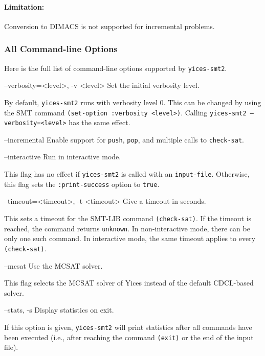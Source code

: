 \documentclass[11pt,twoside,fleqn,openright,titlepage]{cslreport}
\newenvironment{options}{
\begin{list}{}{
\setlength{\labelsep}{1.8ex}
\setlength{\labelwidth}{0pt}
\setlength{\itemindent}{-0.5\leftmargin}
\settowidth{\leftmargin}{\texttt{--}}
\renewcommand{\makelabel}{\optionlabel}}}
{\end{list}}
\newcommand*\optionlabel[1]{\hspace\labelsep\texttt{#1}}
\begin{document}
\paragraph{Limitation:} Conversion to DIMACS is not supported for incremental problems.



\subsubsection*{All Command-line Options}

Here is the full list of command-line options supported by
\texttt{yices-smt2}.
\begin{options}
\item[--verbosity=<level>, -v <level>] Set the initial verbosity level.

  By default, \texttt{yices-smt2} runs with verbosity level 0. This
  can be changed by using the SMT command \texttt{(set-option :verbosity <level>)}.
  Calling \texttt{yices-smt2 --verbosity=<level>} has the same effect.

\item[--incremental] Enable support for \texttt{push},
  \texttt{pop}, and multiple calls to \texttt{check-sat}.

\item[--interactive] Run in interactive mode.

   This flag has no effect if \texttt{yices-smt2} is called with an
   \texttt{input-file}. Otherwise, this flag sets the
   \texttt{:print-success} option to \texttt{true}.

\item[--timeout=<timeout>, -t <timeout>] Give a timeout in seconds.

  This sets a timeout for the SMT-LIB command \texttt{(check-sat)}. If
  the timeout is reached, the command returns \texttt{unknown}. In
  non-interactive mode, there can be only one such command. In
  interactive mode, the same timeout applies to every
  \texttt{(check-sat)}.

\item[--mcsat] Use the MCSAT solver.

   This flag selects the MCSAT solver of Yices instead of the default
   CDCL-based solver.

\item[--stats, -s] Display statistics on exit.

  If this option is given, \texttt{yices-smt2} will print statistics
  after all commands have been executed (i.e., after reaching the
  command \texttt{(exit)} or the end of the input file).


\end{options}
\end{document}
